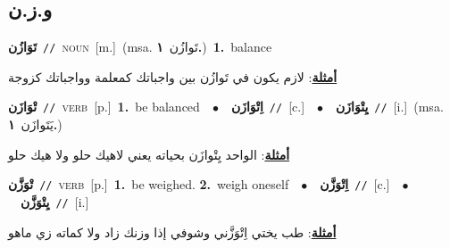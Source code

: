 \documentclass[10pt,a4paper,twoside]{article} %
\begin{document}
\begin{multicols}{2}
\vspace{-3mm}
\subsection*{\color{blue}\foreignlanguage{arabic}{و.ز.ن}\color{blue}{}} 

{\setlength\topsep{0pt}\textbf{\foreignlanguage{arabic}{تَوَازُن}}\ {\color{gray}\texttt{//}\color{black}}\ \textsc{noun}\ [m.]\ \color{gray}(msa. \foreignlanguage{arabic}{تَوازُن}~\foreignlanguage{arabic}{\textbf{١.}})\color{black}\ \textbf{1.}~balance\  \begin{flushright}\color{gray}\foreignlanguage{arabic}{\textbf{\underline{\foreignlanguage{arabic}{أمثلة}}}: لازم يكون في تَوازُن بين واجباتك كمعلمة وواجباتك كزوجة}\end{flushright}\color{black}} \vspace{2mm}

{\setlength\topsep{0pt}\textbf{\foreignlanguage{arabic}{تْوَازَن}}\ {\color{gray}\texttt{//}\color{black}}\ \textsc{verb}\ [p.]\ \textbf{1.}~be balanced\ \ $\bullet$\ \ \setlength\topsep{0pt}\textbf{\foreignlanguage{arabic}{اِتْوَازَن}}\ {\color{gray}\texttt{//}\color{black}}\ [c.]\ \ $\bullet$\ \ \setlength\topsep{0pt}\textbf{\foreignlanguage{arabic}{يِتْوَازَن}}\ {\color{gray}\texttt{//}\color{black}}\ [i.]\ \color{gray}(msa. \foreignlanguage{arabic}{يَتَوازَن}~\foreignlanguage{arabic}{\textbf{١.}})\color{black}\  \begin{flushright}\color{gray}\foreignlanguage{arabic}{\textbf{\underline{\foreignlanguage{arabic}{أمثلة}}}: الواحد يِتْوازَن بحياته يعني لاهيك حلو ولا هيك حلو}\end{flushright}\color{black}} \vspace{2mm}

{\setlength\topsep{0pt}\textbf{\foreignlanguage{arabic}{تْوَزَّن}}\ {\color{gray}\texttt{//}\color{black}}\ \textsc{verb}\ [p.]\ \textbf{1.}~be weighed.  \textbf{2.}~weigh oneself\ \ $\bullet$\ \ \setlength\topsep{0pt}\textbf{\foreignlanguage{arabic}{اِتْوَزَّن}}\ {\color{gray}\texttt{//}\color{black}}\ [c.]\ \ $\bullet$\ \ \setlength\topsep{0pt}\textbf{\foreignlanguage{arabic}{يِتْوَزَّن}}\ {\color{gray}\texttt{//}\color{black}}\ [i.]\  \begin{flushright}\color{gray}\foreignlanguage{arabic}{\textbf{\underline{\foreignlanguage{arabic}{أمثلة}}}: طب يختي اِتْوَزَّني وشوفي إذا وزنك زاد ولا كماته زي ماهو}\end{flushright}\color{black}} \vspace{2mm}


\end{multicols}
\end{document}
